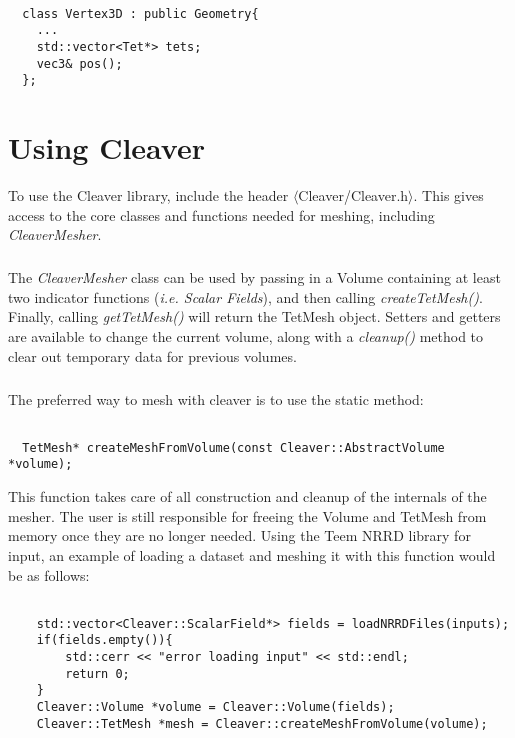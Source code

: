\documentclass[fleqn,12pt,openany]{book}
\begin{document}
\begin{verbatim}

  class Vertex3D : public Geometry{
    ...
    std::vector<Tet*> tets;
    vec3& pos();
  };

\end{verbatim}

\chapter{Using Cleaver}

To use the Cleaver library, include the header
$\langle$Cleaver/Cleaver.h$\rangle$. This gives 
access to the core classes and functions needed for 
meshing, including \emph{CleaverMesher}. 

\paragraph{}
The \emph{CleaverMesher} class can be used by passing in a Volume
containing at least two indicator functions (\emph{i.e. Scalar Fields}),
and then calling \emph{createTetMesh()}. Finally, calling \emph{getTetMesh()}
will return the TetMesh object. Setters and getters are available to change
the current volume, along with a \emph{cleanup()} method to clear out
temporary data for previous volumes.

\paragraph{}
The preferred way to mesh with cleaver is to use the static method:

\begin{verbatim}

  TetMesh* createMeshFromVolume(const Cleaver::AbstractVolume *volume);
\end{verbatim}

This function takes care of all construction and cleanup of the internals
of the mesher. The user is still responsible for freeing the Volume and
TetMesh from memory once they are no longer needed. Using the Teem NRRD 
library for input, an example of loading a dataset and meshing it with 
this function would be as follows:

\begin{verbatim}
    
    std::vector<Cleaver::ScalarField*> fields = loadNRRDFiles(inputs);
    if(fields.empty()){
        std::cerr << "error loading input" << std::endl;
        return 0;
    }
    Cleaver::Volume *volume = Cleaver::Volume(fields);
    Cleaver::TetMesh *mesh = Cleaver::createMeshFromVolume(volume);
\end{verbatim}
\end{document}
